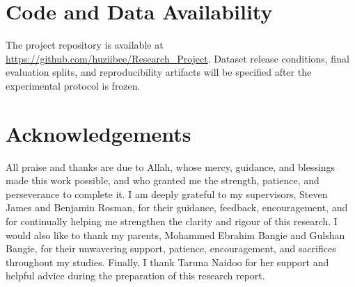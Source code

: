 \documentclass[10pt,conference]{IEEEtran}
\begin{document}
\section*{Code and Data Availability}
The project repository is available at \url{https://github.com/huziibee/Research_Project}. Dataset release conditions, final evaluation splits, and reproducibility artifacts will be specified after the experimental protocol is frozen.
\section*{Acknowledgements}
All praise and thanks are due to Allah, whose mercy, guidance, and blessings made this work possible, and who granted me the strength, patience, and perseverance to complete it. I am deeply grateful to my supervisors, Steven James and Benjamin Rosman, for their guidance, feedback, encouragement, and for continually helping me strengthen the clarity and rigour of this research. I would also like to thank my parents, Mohammed Ebrahim Bangie and Gulshan Bangie, for their unwavering support, patience, encouragement, and sacrifices throughout my studies. Finally, I thank Taruna Naidoo for her support and helpful advice during the preparation of this research report.
\end{document}
